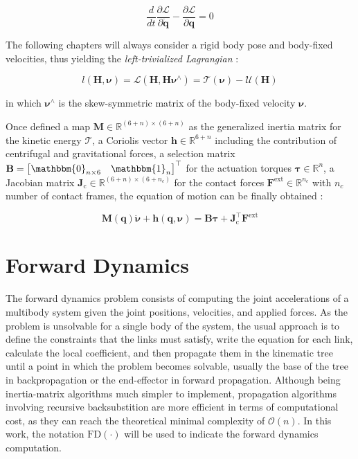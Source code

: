 \begin{equation}
    \frac{d}{dt} \frac{\partial \mathcal{L}}{\partial \mathbf{\dot{q}}} - \frac{\partial \mathcal{L}}{\partial \mathbf{q}} = 0
    \label{eqn:lagrangian}
\end{equation}

The following chapters will always consider a rigid body pose and body-fixed velocities, thus yielding the \textit{left-trivialized Lagrangian} \citep{traversaro_modelling_2019}:

\begin{equation}
    l(\mathbf{H}, \boldsymbol{\nu}) = \mathcal{L}(\mathbf{H}, \mathbf{H}\boldsymbol{\nu}^\wedge) = \mathcal{T}(\boldsymbol{\nu}) - \mathcal{U}(\mathbf{H})
\end{equation}

in which $\boldsymbol{\nu}^\wedge$ is the skew-symmetric matrix of the body-fixed velocity $\boldsymbol{\nu}$.

Once defined a map $\mathbf{M} \in \mathbb{R}^{(6+n) \times (6+n)}$ as the generalized inertia matrix for the kinetic energy $\mathcal{T}$, a Coriolis vector $\mathbf{h} \in \mathbb{R} ^{6+n}$ including the contribution of centrifugal and gravitational forces, a selection matrix $\mathbf{B} = \begin{bmatrix} \mathbbm{0}_{n\times6} & \mathbbm{1}_n \end{bmatrix}^\top$ for the actuation torques $\boldsymbol{\tau} \in \mathbb{R} ^n$, a Jacobian matrix $\mathbf{J} _\text{c} \in \mathbb{R} ^{(6+n) \times (6+n_c)}$ for the contact forces $\mathbf{F} ^\text{ext} \in \mathbb{R} ^{n_c}$ with $n_c$ number of contact frames, the equation of motion can be finally obtained \citep{SicilianoKhatib2008}:

\begin{equation}
    \label{eqn:equation_of_motion}
    \mathbf{M}(\mathbf{q}) \mathbf{\ddot{\boldsymbol{\nu}}} + \mathbf{h} (\mathbf{q}, \boldsymbol{\nu}) = \mathbf{B}\boldsymbol{\tau} + \mathbf{J}^\top _\text{c} \mathbf{F} ^\text{ext}
\end{equation}


\section{Forward Dynamics}
\label{sec:back_fd}

The forward dynamics problem consists of computing the joint accelerations of a multibody system given the joint positions, velocities, and applied forces. As the problem is unsolvable for a single body of the system, the usual approach is to define the constraints that the links must satisfy, write the equation for each link, calculate the local coefficient, and then propagate them in the kinematic tree until a point in which the problem becomes solvable, usually the base of the tree in backpropagation or the end-effector in forward propagation. Although being inertia-matrix algorithms much simpler to implement, propagation algorithms involving recursive backsubstition are more efficient in terms of computational cost, as they can reach the theoretical minimal complexity of $\mathcal{O}(n)$. In this work, the notation $\mathrm{FD}(\cdot)$ will be used to indicate the forward dynamics computation.


